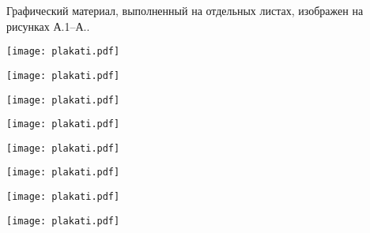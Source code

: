 
Графический материал, выполненный на отдельных листах,
изображен на рисунках А.1--А..
\setcounter{числоПлакатов}{0}

\renewcommand{\thefigure}{А.\arabic{figure}} %

\begin{landscape}

\begin{плакат}
    \texttt{[image: plakati.pdf]}
    \label{pl1:image}      
\end{плакат}

\begin{плакат}
	\texttt{[image: plakati.pdf]}
	\label{pl2:image}      
\end{плакат}

\begin{плакат}
	\texttt{[image: plakati.pdf]}
	\label{pl3:image}      
\end{плакат}

\begin{плакат}
	\texttt{[image: plakati.pdf]}
	\label{pl4:image}      
\end{плакат}

\begin{плакат}
	\texttt{[image: plakati.pdf]}
	\label{pl5:image}      
\end{плакат}

\begin{плакат}
	\texttt{[image: plakati.pdf]}
	\label{pl6:image}      
\end{плакат}

\begin{плакат}
	\texttt{[image: plakati.pdf]}
	\label{pl7:image}      
\end{плакат}

\begin{плакат}
	\texttt{[image: plakati.pdf]}
	\label{pl8:image}      
\end{плакат}


\end{landscape}
